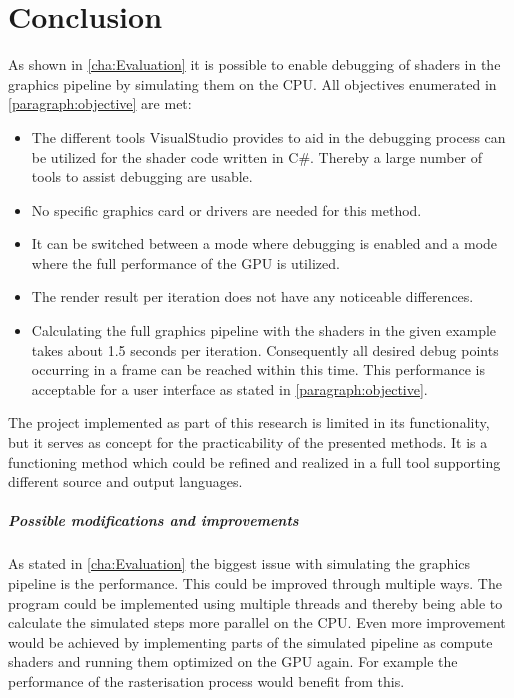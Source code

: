 
\chapter{Conclusion}\label{cha:Conclusion}

As shown in \autoref{cha:Evaluation} it is possible to enable debugging of shaders in the graphics pipeline by simulating them on the CPU. All objectives enumerated in \autoref{paragraph:objective} are met:

\begin{itemize}
\item The different tools VisualStudio provides to aid in the debugging process can be utilized for the shader code written in C\#. Thereby a large number of tools to assist debugging are usable.
\item No specific graphics card or drivers are needed for this method. 
\item It can be switched between a mode where debugging is enabled and a mode where the full performance of the GPU is utilized.
\item The render result per iteration does not have any noticeable differences.
\item Calculating the full graphics pipeline with the shaders in the given example takes about 1.5 seconds per iteration. Consequently all desired debug points occurring in a frame can be reached within this time. This performance is acceptable for a user interface as stated in \autoref{paragraph:objective}.
\end{itemize}

The project implemented as part of this research is limited in its functionality, but it serves as concept for the practicability of the presented methods. It is a functioning method which could be refined and realized in a full tool supporting different source and output languages.

\paragraph{Possible modifications and improvements}

As stated in \autoref{cha:Evaluation} the biggest issue with simulating the graphics pipeline is the performance. This could be improved through multiple ways. The program could be implemented using multiple threads and thereby being able to calculate the simulated steps more parallel on the CPU. Even more improvement would be achieved by implementing parts of the simulated pipeline as compute shaders and running them optimized on the GPU again. For example the performance of the rasterisation process would benefit from this.

